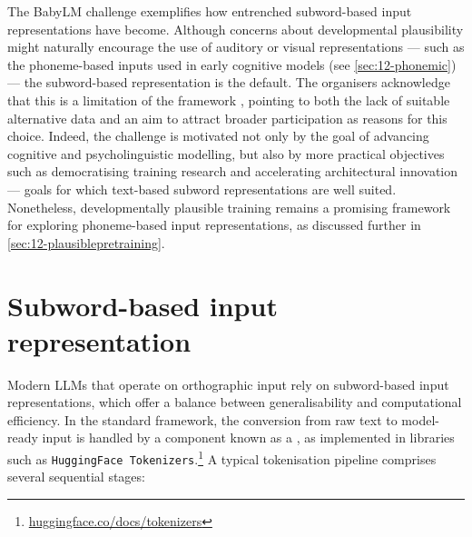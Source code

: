 The BabyLM challenge exemplifies how entrenched subword-based input representations have become. Although concerns about developmental plausibility might naturally encourage the use of auditory or visual representations --- such as the phoneme-based inputs used in early cognitive models (see \cref{sec:12-phonemic}) --- the subword-based representation is the default. The organisers acknowledge that this is a limitation of the framework \citep{wilcox2025bigger}, pointing to both the lack of suitable alternative data and an aim to attract broader participation as reasons for this choice. Indeed, the challenge is motivated not only by the goal of advancing cognitive and psycholinguistic modelling, but also by more practical objectives such as democratising training research and accelerating architectural innovation --- goals for which text-based subword representations are well suited. Nonetheless, developmentally plausible training remains a promising framework for exploring phoneme-based input representations, as discussed further in \cref{sec:12-plausiblepretraining}.


\section{Subword-based input representation}\label{sec:12-subword}

Modern LLMs that operate on orthographic input rely on subword-based input representations, which offer a balance between generalisability and computational efficiency. In the standard framework, the conversion from raw text to model-ready input is handled by a component known as a , as implemented in libraries such as \texttt{HuggingFace Tokenizers}.\footnote{\href{https://huggingface.co/docs/tokenizers/index}{huggingface.co/docs/tokenizers}} A typical tokenisation pipeline comprises several sequential stages:

